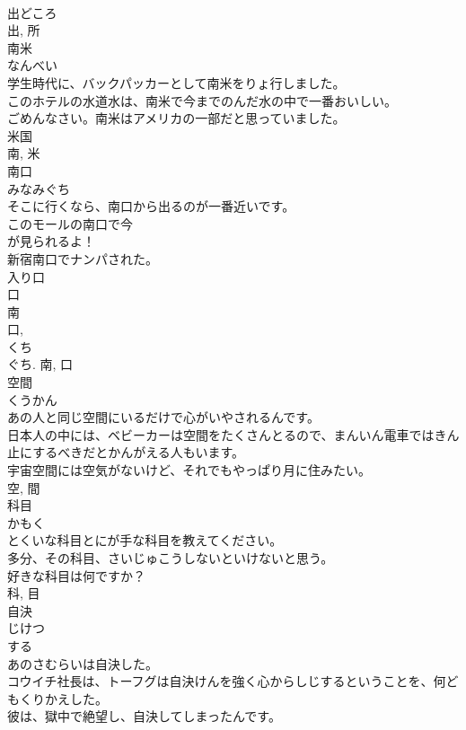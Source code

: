 \documentclass[8pt]{extreport}
\begin{document}
\begin{CJK}{UTF8}{min}
\\	出どころ 
\\	出, 所	
\\	南米	
\\	なんべい	
\\	学生時代に、バックパッカーとして南米をりょ行しました。	
\\	このホテルの水道水は、南米で今までのんだ水の中で一番おいしい。	
\\	ごめんなさい。南米はアメリカの一部だと思っていました。	
\\	米国 
\\	南, 米	
\\	南口	
\\	みなみぐち	
\\	そこに行くなら、南口から出るのが一番近いです。	
\\	このモールの南口で今
\\	が見られるよ！	
\\	新宿南口でナンパされた。	
\\	入り口 
\\	口 
\\	南 
\\	口, 
\\	くち 
\\	ぐち.	南, 口	
\\	空間	
\\	くうかん	
\\	あの人と同じ空間にいるだけで心がいやされるんです。	
\\	日本人の中には、ベビーカーは空間をたくさんとるので、まんいん電車ではきん止にするべきだとかんがえる人もいます。	
\\	宇宙空間には空気がないけど、それでもやっぱり月に住みたい。	
\\	空, 間	
\\	科目	
\\	かもく	
\\	とくいな科目とにが手な科目を教えてください。	
\\	多分、その科目、さいじゅこうしないといけないと思う。	
\\	好きな科目は何ですか？	
\\	科, 目	
\\	自決	
\\	じけつ	
\\	する 
\\	あのさむらいは自決した。	
\\	コウイチ社長は、トーフグは自決けんを強く心からしじするということを、何どもくりかえした。	
\\	彼は、獄中で絶望し、自決してしまったんです。	

\end{CJK}
\end{document}

